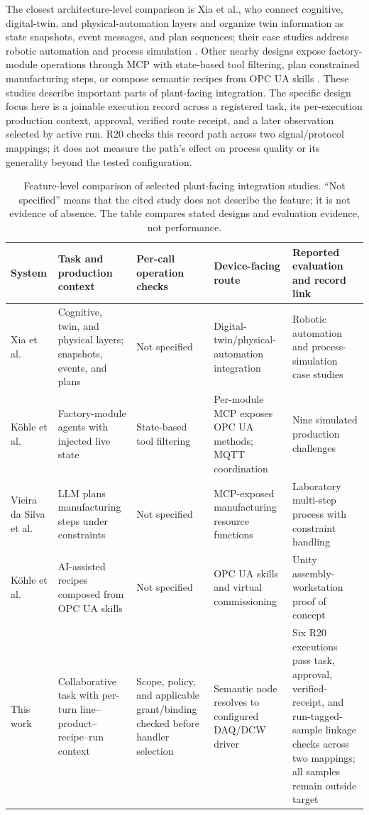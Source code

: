 The closest architecture-level comparison is Xia et al., who connect cognitive,
digital-twin, and physical-automation layers and organize twin information as
state snapshots, event messages, and plan sequences; their case studies
address robotic automation and process simulation
\cite{xia2025architecture}. Other nearby designs expose factory-module
operations through MCP with state-based tool filtering, plan constrained
manufacturing steps, or compose semantic recipes from OPC UA skills
\cite{koehle2026llmdriven,silva2025mcpmanufacturing,koehle2025semanticrecipes}.
These studies describe important parts of plant-facing integration. The
specific design focus here is a joinable execution record across a registered
task, its per-execution production context, approval, verified route receipt,
and a later observation selected by active run. R20 checks this record path
across two signal/protocol mappings; it does not measure the path's effect on
process quality or its generality beyond the tested configuration.
\begin{table}[!t]
\centering
\caption{Feature-level comparison of selected plant-facing integration
studies. ``Not specified'' means that the cited study does not describe the
feature; it is not evidence of absence. The table compares stated designs and
evaluation evidence, not performance.}
\label{tab:nearest}
\small
\setlength{\tabcolsep}{3pt}
\begin{tabularx}{\textwidth}{@{}p{1.8cm}p{3.0cm}p{2.4cm}p{2.8cm}X@{}}
\toprule
System & Task and production context & Per-call operation checks & Device-facing route & Reported evaluation and record link \\
\midrule
Xia et al. \cite{xia2025architecture} & Cognitive, twin, and physical layers; snapshots, events, and plans & Not specified & Digital-twin/physical-automation integration & Robotic automation and process-simulation case studies \\
K{\"o}hle et al. \cite{koehle2026llmdriven} & Factory-module agents with injected live state & State-based tool filtering & Per-module MCP exposes OPC UA methods; MQTT coordination & Nine simulated production challenges \\
Vieira da Silva et al. \cite{silva2025mcpmanufacturing} & LLM plans manufacturing steps under constraints & Not specified & MCP-exposed manufacturing resource functions & Laboratory multi-step process with constraint handling \\
K{\"o}hle et al. \cite{koehle2025semanticrecipes} & AI-assisted recipes composed from OPC UA skills & Not specified & OPC UA skills and virtual commissioning & Unity assembly-workstation proof of concept \\
\midrule
This work & Collaborative task with per-turn line--product--recipe--run context & Scope, policy, and applicable grant/binding checked before handler selection & Semantic node resolves to configured DAQ/DCW driver & Six R20 executions pass task, approval, verified-receipt, and run-tagged-sample linkage checks across two mappings; all samples remain outside target \\
\bottomrule
\end{tabularx}
\end{table}

